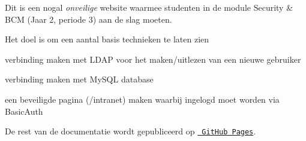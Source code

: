 Dit is een nogal {\itshape onveilige} website waarmee studenten in de module Security \& BCM (Jaar 2, periode 3) aan de slag moeten.

Het doel is om een aantal basis technieken te laten zien
\begin{DoxyEnumerate}
\item verbinding maken met LDAP voor het maken/uitlezen van een nieuwe gebruiker
\end{DoxyEnumerate}
\begin{DoxyEnumerate}
\item verbinding maken met My\+SQL database
\end{DoxyEnumerate}
\begin{DoxyEnumerate}
\item een beveiligde pagina (/intranet) maken waarbij ingelogd moet worden via Basic\+Auth
\end{DoxyEnumerate}

De rest van de documentatie wordt gepubliceerd op \href{https://nhlstenden.github.io/SecBCMPrototype/}{\texttt{ Git\+Hub Pages}}. 